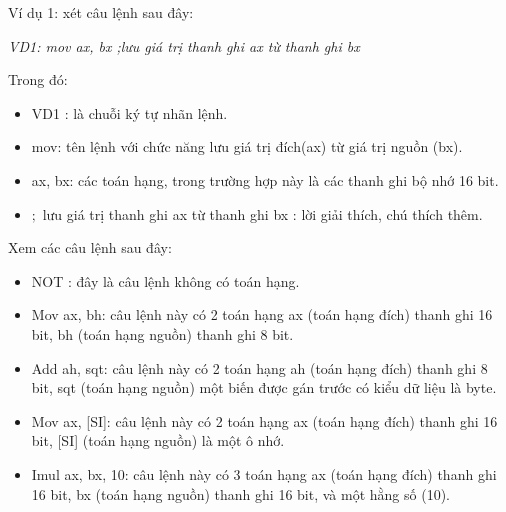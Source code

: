 	Ví dụ 1: xét câu lệnh sau đây: 
	 \begin{center}		 
		\textit{VD1: mov ax, bx	;lưu giá trị thanh ghi ax từ thanh ghi bx }
	\end{center}
	Trong đó:
	\begin{itemize}
		\renewcommand{\labelitemi}{\textbullet}			
	  \item	VD1 : là chuỗi ký tự nhãn lệnh.
	\item	mov: tên lệnh với chức năng lưu giá trị đích(ax) từ giá trị nguồn (bx).
	\item	ax, bx: các toán hạng, trong trường hợp này là các thanh ghi bộ nhớ 16 bit.
	\item $;$ lưu giá trị thanh ghi ax từ thanh ghi bx : lời giải thích, chú thích thêm.
	\end{itemize}
	
	\newpage
	Xem các câu lệnh sau đây:
	\begin{itemize}
	\renewcommand{\labelitemi}{\textbullet}		
	\item  NOT	: đây là câu lệnh không có toán hạng.
	\item	Mov ax, bh: câu lệnh này có 2 toán hạng ax (toán hạng đích) thanh ghi 16 bit, bh (toán hạng nguồn) thanh ghi 8 bit.
	\item	Add ah, sqt: câu lệnh này có 2 toán hạng ah (toán hạng đích) thanh ghi 8 bit, sqt (toán hạng nguồn) một biến được gán trước có kiểu dữ liệu là byte.
	\item	Mov ax, [SI]: câu lệnh này có 2 toán hạng ax (toán hạng đích) thanh ghi 16 bit, [SI] (toán hạng nguồn) là một ô nhớ.
	\item	Imul ax, bx, 10: câu lệnh này có 3 toán hạng ax (toán hạng đích) thanh ghi 16 bit, bx (toán hạng nguồn) thanh ghi 16 bit, và một hằng số (10).
	\end{itemize}

